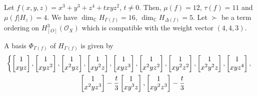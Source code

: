 \documentclass[10pt,a4paper]{amsart}
\numberwithin{equation}{section}
\begin{document}
\begin{Example}
Let $f(x,y,z) = x^3+y^3+z^4+txyz^2$, $t\ne 0$. Then, $\mu(f)=12$, $\tau(f)=11$ and $\mu(f|H_{z})=4$.
We have $\dim_{{\mathbb C}}H_{\Gamma(f)} = 16$, $\dim_{{\mathbb C}}H_{\Delta(f)}=5$.
Let $\succ$ be a term ordering on $H_{[O]}^{3}({\mathcal O}_X)$ which is compatible with
the weight vector $(4,4,3)$.

A basis $\Phi_{{\Gamma(f)}}$ of $H_{{\Gamma(f)}}$ is given by
\begin{gather*}
\left\{
\begin{bmatrix} 1 \\ x y z \end{bmatrix},
\begin{bmatrix} 1 \\ x y z^{2} \end{bmatrix},
\begin{bmatrix} 1 \\ x^2 y z \end{bmatrix},
\begin{bmatrix} 1 \\ x y^2 z \end{bmatrix},
\begin{bmatrix} 1 \\ x y z^{3} \end{bmatrix},
\begin{bmatrix} 1 \\ x^{2} y z^{2} \end{bmatrix},
\begin{bmatrix} 1 \\ x y^{2} z^{2} \end{bmatrix},
\begin{bmatrix} 1 \\ x^{2} y^{2} z \end{bmatrix},
\begin{bmatrix} 1 \\ x y z^{4}\end{bmatrix},\right.
\\
\hphantom{\left\{\right.}
\begin{bmatrix} 1 \\ x^{2} y z^{3} \end{bmatrix} -\dfrac{t}{3}
\begin{bmatrix} 1 \\ x y^{3} z\end{bmatrix},
\begin{bmatrix} 1 \\ x y^{2} z^{3} \end{bmatrix} -\dfrac{t}{3}

\end{gather*}
\end{Example}
\end{document}
